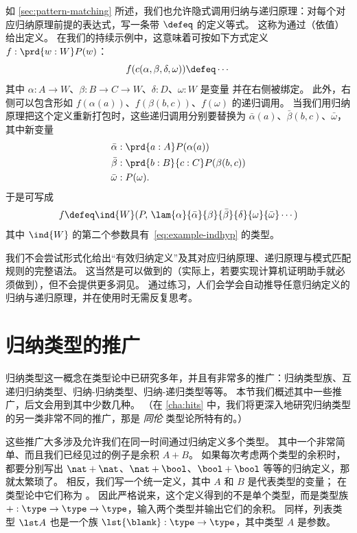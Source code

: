 如 \cref{sec:pattern-matching} 所述，我们也允许隐式调用归纳与递归原理：对每个对应归纳原理前提的表达式，写一条带 $\defeq$ 的定义等式。
这称为通过（依值）给出定义。
%
%
在我们的持续示例中，这意味着可按如下方式定义 $f:\prd{w:W} P(w) $：
\[ f(c(\alpha,\beta,\delta,\omega)) \defeq \cdots \]
其中 $\alpha:A\to W$、$\beta:B\to C\to W$、$\delta:D$、$\omega:W$ 是变量
%
并在右侧被绑定。
此外，右侧可以包含形如 $f(\alpha(a))$、$f(\beta(b,c))$、$f(\omega)$ 的递归调用。
当我们用归纳原理把这个定义重新打包时，这些递归调用分别要替换为 $\bar\alpha(a)$、$\bar\beta(b,c)$、$\bar\omega$，其中新变量
\begin{align*}
  \bar\alpha &: \prd{a:A} P(\alpha(a))\\
  \bar\beta &: \prd{b:B}{c:C} P(\beta(b,c))\\
  \bar\omega &: P(\omega).
\end{align*}
%
于是可写成
\[ f \defeq \ind{W}(P,\, \lam{\alpha}{\bar\alpha}{\beta}{\bar\beta}{\delta}{\omega}{\bar\omega} \cdots ) \]
其中 $\ind{W}$ 的第二个参数具有~\eqref{eq:example-indhyp} 的类型。

我们不会尝试形式化给出“有效归纳定义”及其对应归纳原理、递归原理与模式匹配规则的完整语法。
这当然是可以做到的（实际上，若要实现计算机证明助手就必须做到），但不会提供更多洞见。
通过练习，人们会学会自动推导任意归纳定义的归纳与递归原理，并在使用时无需反复思考。
\section{归纳类型的推广}
\label{sec:generalizations}

%
归纳类型这一概念在类型论中已研究多年，并且有非常多的推广：归纳类型族、互递归归纳类型、归纳-归纳类型、归纳-递归类型等等。
本节我们概述其中一些推广，后文会用到其中少数几种。
（在 \cref{cha:hits} 中，我们将更深入地研究归纳类型的另一类非常不同的推广，那是 \emph{同伦} 类型论所特有的。）

这些推广大多涉及允许我们在同一时间通过归纳定义多个类型。
其中一个非常简单、而且我们已经见过的例子是余积 $A+B$。
如果每次考虑两个类型的余积时，都要分别写出 $\nat+\nat$、$\nat+\bool$、$\bool+\bool$ 等等的归纳定义，那就太繁琐了。
相反，我们写一个统一定义，其中 $A$ 和 $B$ 是代表类型的变量；
%
在类型论中它们称为 。%
因此严格说来，这个定义得到的不是单个类型，而是类型族 $+ : \type\to\type\to\type$，输入两个类型并输出它们的余积。
同样，列表类型 $\lst A$ 也是一个族 $\lst{\blank}:\type\to\type$，其中类型 $A$ 是参数。

